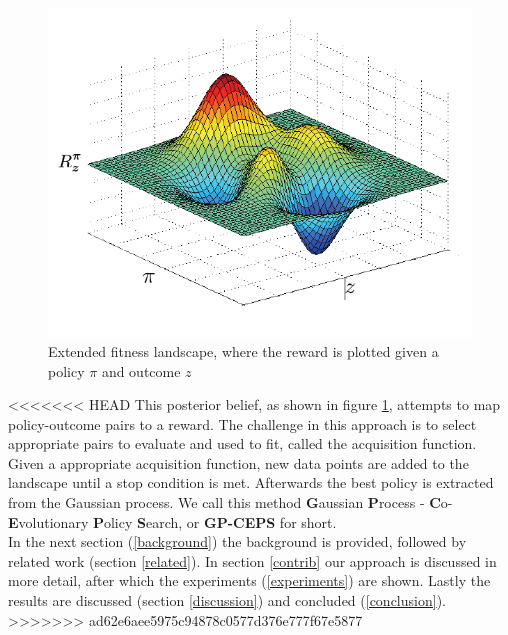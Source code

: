 \begin{figure}[ht]
  \centering
  \includegraphics[scale=0.5]{images/fitness-landscape.png}
  \caption{Extended fitness landscape, where the reward is plotted given a policy $\pi$ and outcome $z$}\label{fitnesslandscape}
\end{figure}

<<<<<<< HEAD
This posterior belief, as shown in figure \ref{fitnesslandscape}, attempts to map policy-outcome pairs to a reward. The challenge in this approach is to select appropriate pairs to evaluate and used to fit, called the acquisition function. Given a appropriate acquisition function, new data points are added to the landscape until a stop condition is met. Afterwards the best policy is extracted from the Gaussian process. We call this method \textbf{G}aussian \textbf{P}rocess - \textbf{C}o-\textbf{E}volutionary \textbf{P}olicy \textbf{S}earch, or \textbf{GP-CEPS} for short. \\


In the next section (\ref{background}) the background is provided, followed by related work (section \ref{related}). In section \ref{contrib} our approach is discussed in more detail, after which the experiments (\ref{experiments}) are shown. Lastly the results are discussed (section \ref{discussion}) and concluded (\ref{conclusion}).
>>>>>>> ad62e6aee5975c94878c0577d376e777f67e5877


